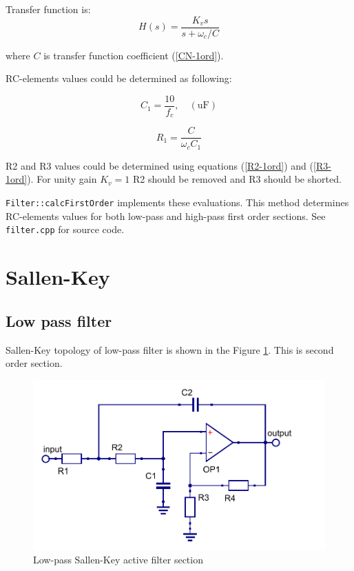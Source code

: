 Transfer function is:
\begin{equation}
 H(s)=\frac{K_v s}{s+\omega_c/C}
\end{equation}

where $C$ is transfer function coefficient (\ref{CN-1ord}).

RC-elements values could be determined as following:

\begin{equation}
 C_1 = \frac{10}{f_c}, \quad (\mbox{uF})
\end{equation}

\begin{equation}
 R_1=\frac{C}{\omega_cC_1}
\end{equation}

R2 and R3 values could be determined using equations (\ref{R2-1ord}) and
(\ref{R3-1ord}). For unity gain $K_v=1$  R2 should be removed and
R3 should be shorted. 

\verb|Filter::calcFirstOrder| implements these evaluations. This method
determines RC-elements values for both low-pass and high-pass first order
sections. See \verb|filter.cpp| for source code.

\section{Sallen-Key}

\subsection{Low pass filter}

Sallen-Key topology of low-pass filter is shown in the Figure
\ref{fig:sk-lpf}. This is second order section.

\begin{figure}[!ht]
  \centering
  \includegraphics[width=0.6\linewidth]{pics/sk-lpf}
  \caption{Low-pass Sallen-Key active filter section}
  \label{fig:sk-lpf}
\end{figure}

